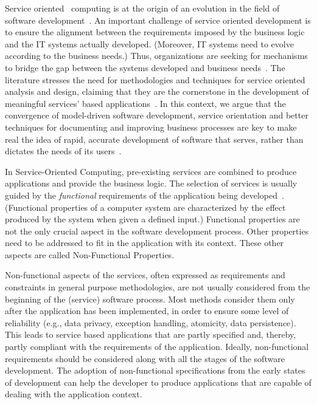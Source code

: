 Service oriented~\cite{Papazoglou2007} computing is at the origin of an evolution in the field of software development~\cite{??}. 
An important challenge of service oriented development is  to ensure the alignment between the requirements imposed by the business logic and the IT systems actually developed.
(Moreover, IT systems need to evolve according to the business needs.)
Thus, organizations are seeking for mechanisms to bridge the gap between the systems developed and business needs~\cite{bell}. 
The literature stresses the need for methodologies and techniques for service oriented analysis and design, claiming that they are the cornerstone  in the development of meaningful services' based applications~\cite{5}.  
In this context, we argue that the convergence of model-driven software development, service orientation and better techniques for documenting and improving business processes are key to make real the idea of rapid, accurate development of software that serves, rather than dictates the needs of its users~\cite{watson}. 

In Service-Oriented Computing, pre-existing services are
combined to produce applications and provide the business logic. 
The selection of services is usually guided by the \textit{functional} requirements of the application being developed~\cite{1,2,decastro1,PapazoglouH06}. 
(Functional properties of a computer system are characterized by the effect produced by the system when given a defined input.)
Functional properties are not the only crucial aspect in the software development process. 
Other properties need to be addressed to fit in the application with its context.
These other aspects are called Non-Functional Properties.

Non-functional aspects of the services, often expressed as requirements and constraints in general purpose methodologies, are not usually considered from the beginning of the (service) software process.
Most methods consider them only after the application has been implemented, in order to ensure some level of reliability (e.g., data privacy, exception handling, atomicity, data persistence). 
This leads to service based applications that are partly specified and, thereby, partly compliant with the requirements of the application.
Ideally, non-functional requirements should be considered along with all the stages of the software development. 
The adoption of non-functional specifications from the early states of development
can help the developer to produce applications that are capable of dealing with
the application context.

